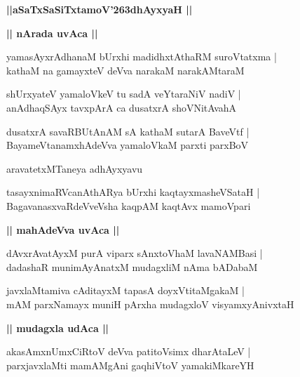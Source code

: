 \documentclass[twoside,12pt,openright]{book}
\def\S{\char'263}
\newcounter{shloka}[chapter]
\def\uvaca#1{\centerline{{\large\textbf{#1}}}}
\begin{document}
\begin{center}
{\LARGE\bfseries ||aSaTxSaSiTxtamoV\S dhAyxyaH || }
\end{center}

\uvaca{|| nArada uvAca ||}

\begin{shloka}%
yamasAyxrAdhanaM bUrxhi madidhxtAthaRM suroVtatxma |\\
kathaM na gamayxteV deVva narakaM narakAMtaraM 
\end{shloka}

\begin{shloka}%
shUrxyateV yamaloVkeV tu sadA veYtaraNiV nadiV |\\
anAdhaqSAyx tavxpArA ca dusatxrA shoVNitAvahA 
\end{shloka}

\begin{shloka}%
dusatxrA savaRBUtAnAM sA kathaM sutarA BaveVtf |\\
BayameVtanamxhAdeVva yamaloVkaM parxti parxBoV
\end{shloka}

\begin{center}
aravatetxMTaneya adhAyxyavu
\end{center}

\begin{shloka}%
tasayxnimaRVcanAthARya bUrxhi kaqtayxmasheVSataH |\\
BagavanasxvaRdeVveVsha kaqpAM kaqtAvx mamoVpari 
\end{shloka}

\uvaca{|| mahAdeVva uvAca ||}

\begin{shloka}%
dAvxrAvatAyxM purA viparx sAnxtoVhaM lavaNAMBasi |\\
dadashaR munimAyAnatxM mudagxliM nAma bADabaM 
\end{shloka}

\begin{shloka}%
javxlaMtamiva cAditayxM tapasA doyxVtitaMgakaM |\\
mAM parxNamayx muniH pArxha mudagxloV visyamxyAnivxtaH 
\end{shloka}

\uvaca{|| mudagxla udAca ||}

\begin{shloka}%
akasAmxnUmxCiRtoV deVva patitoVsimx dharAtaLeV |\\
parxjavxlaMti mamAMgAni gaqhiVtoV yamakiMkareYH 
\end{shloka}
\end{document}
